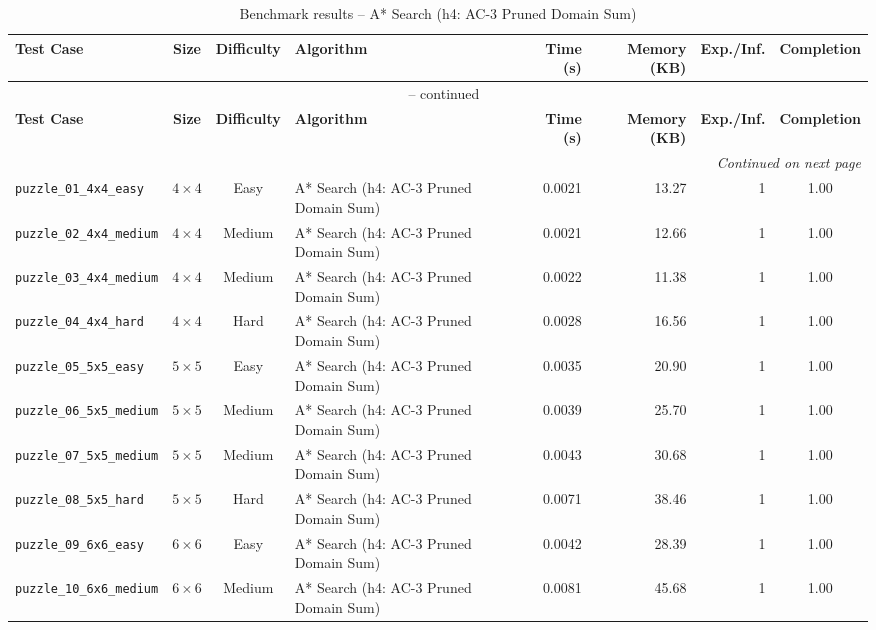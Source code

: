 \documentclass{article}
\begin{document}
\begin{longtable}{@{}lccl r r r c@{}}
  \caption{Benchmark results -- A* Search (h4: AC-3 Pruned Domain Sum)} \label{tab:a__search__h4__ac_3_pruned_domain_sum} \\
  \toprule
  \textbf{Test Case} & \textbf{Size} & \textbf{Difficulty} & \textbf{Algorithm} & \textbf{Time (s)} & \textbf{Memory (KB)} & \textbf{Exp./Inf.} & \textbf{Completion} \\
  \midrule
  \endfirsthead
  \multicolumn{8}{c}{\tablename\ \thetable{} -- continued} \\
  \toprule
  \textbf{Test Case} & \textbf{Size} & \textbf{Difficulty} & \textbf{Algorithm} & \textbf{Time (s)} & \textbf{Memory (KB)} & \textbf{Exp./Inf.} & \textbf{Completion} \\
  \midrule
  \endhead
  \midrule
  \multicolumn{8}{r}{\textit{Continued on next page}} \\
  \endfoot
  \bottomrule
  \endlastfoot
  \texttt{puzzle\_01\_4x4\_easy} & $4\times4$ & Easy & A* Search (h4: AC-3 Pruned Domain Sum) & 0.0021 & 13.27 & 1 & 1.00 \\
  \texttt{puzzle\_02\_4x4\_medium} & $4\times4$ & Medium & A* Search (h4: AC-3 Pruned Domain Sum) & 0.0021 & 12.66 & 1 & 1.00 \\
  \texttt{puzzle\_03\_4x4\_medium} & $4\times4$ & Medium & A* Search (h4: AC-3 Pruned Domain Sum) & 0.0022 & 11.38 & 1 & 1.00 \\
  \texttt{puzzle\_04\_4x4\_hard} & $4\times4$ & Hard & A* Search (h4: AC-3 Pruned Domain Sum) & 0.0028 & 16.56 & 1 & 1.00 \\
  \texttt{puzzle\_05\_5x5\_easy} & $5\times5$ & Easy & A* Search (h4: AC-3 Pruned Domain Sum) & 0.0035 & 20.90 & 1 & 1.00 \\
  \texttt{puzzle\_06\_5x5\_medium} & $5\times5$ & Medium & A* Search (h4: AC-3 Pruned Domain Sum) & 0.0039 & 25.70 & 1 & 1.00 \\
  \texttt{puzzle\_07\_5x5\_medium} & $5\times5$ & Medium & A* Search (h4: AC-3 Pruned Domain Sum) & 0.0043 & 30.68 & 1 & 1.00 \\
  \texttt{puzzle\_08\_5x5\_hard} & $5\times5$ & Hard & A* Search (h4: AC-3 Pruned Domain Sum) & 0.0071 & 38.46 & 1 & 1.00 \\
  \texttt{puzzle\_09\_6x6\_easy} & $6\times6$ & Easy & A* Search (h4: AC-3 Pruned Domain Sum) & 0.0042 & 28.39 & 1 & 1.00 \\
  \texttt{puzzle\_10\_6x6\_medium} & $6\times6$ & Medium & A* Search (h4: AC-3 Pruned Domain Sum) & 0.0081 & 45.68 & 1 & 1.00 \\

\end{longtable}
\end{document}
